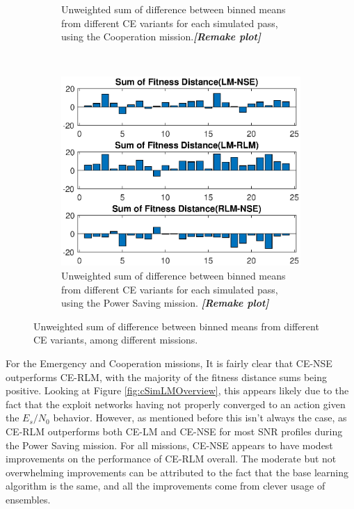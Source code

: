 \begin{figure}[ht]
\begin{subfigure}{0.55\linewidth}
	\caption{Unweighted sum of difference between binned means from different CE variants for each simulated pass, using the Cooperation mission.\textbf{\textit{[Remake plot]}}}
	\label{fig:cSimUnweightCoop}
\end{subfigure}\\
\begin{center}
\begin{subfigure}{0.55\linewidth}
	\centering
	\includegraphics[scale=0.6]{figures/c_sim_results/power_unweighted_sumFitness.eps}
	\caption{Unweighted sum of difference between binned means from different CE variants for each simulated pass, using the Power Saving mission. \textbf{\textit{[Remake plot]}}}
	\label{fig:cSimUnweightPower}
\end{subfigure}
\end{center}
\caption{Unweighted sum of difference between binned means from different CE variants, among different missions.}
\label{fig:unweight_sumFit}
\end{figure}
\clearpage

\par For the Emergency and Cooperation missions, It is fairly clear that CE-NSE outperforms CE-RLM, with the majority of the fitness distance sums being positive. Looking at Figure \ref{fig:cSimLMOverview}, this appears likely due to the fact that the exploit networks having not properly converged to an action given the $E_s/N_0$ behavior. However, as mentioned before this isn't always the case, as CE-RLM outperforms both CE-LM and CE-NSE for most SNR profiles during the Power Saving mission. For all missions, CE-NSE appears to have modest improvements on the performance of CE-RLM overall. The moderate but not overwhelming improvements can be attributed to the fact that the base learning algorithm is the same, and all the improvements come from clever usage of ensembles.


